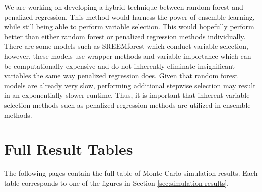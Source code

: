 \documentclass{article}
\begin{document}
We are working on developing a hybrid technique between random forest and penalized regression. This method would harness the power of ensemble learning, while still being able to perform variable selection. This would hopefully perform better than either random forest or penalized regression methods individually. There are some models such as SREEMforest \cite{capitaine2021random} which conduct variable selection, however, these models use wrapper methods and variable importance which can be computationally expensive and do not inherently eliminate insignificant variables the same way penalized regression does. Given that random forest models are already very slow, performing additional stepwise selection may result in an exponentially slower runtime. Thus, it is important that inherent variable selection methods such as penalized regression methods are utilized in ensemble methods.


\newpage



\newpage
\appendix
\section{Full Result Tables}\label{app:full-results}
The following pages contain the full table of Monte Carlo simulation results. Each table corresponds to one of the figures in Section \ref{sec:simulation-results}.

\setlength{\tabcolsep}{3pt}
\end{document}
